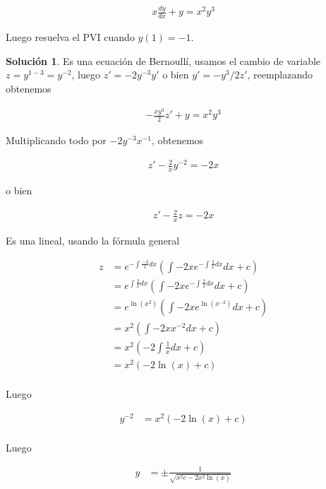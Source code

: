 \documentclass{article}
\theoremstyle{plain}
\theoremstyle{definition}
\newtheorem{sol}[thm]{Solución}
\begin{document}
\begin{align*}
    x\frac{dy}{dx}+y=x^2y^3
\end{align*}

Luego resuelva el PVI cuando $y(1)=-1$. \\

\begin{sol}Es una ecuación de Bernoullí, usamos el cambio de variable $z=y^{1-3}=y^{-2}$, luego $z'=-2y^{-3}y'$ o bien $y'= -y^3/2 z'$, reemplazando obtenemos
\end{sol}

\begin{align*}
    -\frac{xy^3}{2}z'+y=x^2y^3
\end{align*}

Multiplicando todo por $-2y^{-3}x^{-1}$, obtenemos

\begin{align*}
    z'-\frac{2}{x}y^{-2}= -2x
\end{align*}

o bien

\begin{align*}
    z'-\frac{2}{x}z= -2x
\end{align*}

Es una lineal, usando la fórmula general


\begin{align*}
    z &= e^{-\int \frac{-2}{x}dx} \left( \int  -2x e^{-\int \frac{2}{x}dx} dx +c \right) \\
    &= e^{\int \frac{2}{x}dx} \left( \int  -2x e^{-\int \frac{2}{x}dx} dx +c \right) \\
    &= e^{\ln(x^2)} \left( \int  -2xe^{\ln(x^{-2})} dx +c \right) \\
    &= x^2 \left( \int  -2x x^{-2}dx +c \right) \\
    &= x^2 \left( -2\int \frac{1}{x} dx +c \right) \\
    &= x^2 \left( -2\ln(x)+c \right) \\
\end{align*}

Luego

\begin{align*}
 y^{-2}&= x^2 \left( -2\ln(x)+c \right) \\
\end{align*}

Luego

\begin{align*}
 y &= \pm \frac{1}{\sqrt{x^2c-2x^2\ln(x) }}\\
\end{align*}
\end{document}

